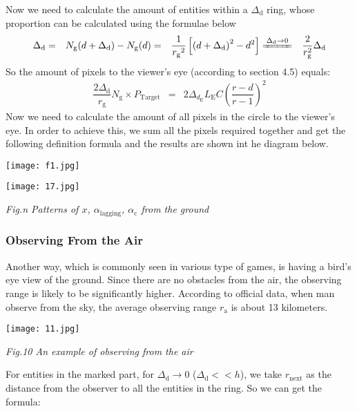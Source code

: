 \documentclass[12pt]{article}
\theoremstyle{definition}
\theoremstyle{remark}
\numberwithin{equation}{section}
\begin{document}
		Now we need to calculate the amount of entities within a $\Delta_\mathrm{d}$ ring, whose proportion can be calculated using the formulae below
		\begin{align}
			\Delta_\mathrm{d}&=&N_\mathrm{g}(d+\Delta_\mathrm{d})-N_\mathrm{g}(d)&=&\dfrac{1}{{r_\mathrm{g}}^2}\left[\left(d+\Delta_\mathrm{ d}\right)^2-d^2\right]&\xlongequal{\Delta_\mathrm{d}\to 0}&\dfrac{2}{{r_\mathrm{g}^2}}\Delta_\mathrm{d}
		\end{align}
		So the amount of pixels to the viewer's eye (according to section 4.5) equals:
		\begin{align}
			\dfrac{2\Delta_\mathrm{d}}{r_\mathrm{g}}N_\mathrm{g}\times P_\mathrm{Target}&=&2\Delta_{d_\mathrm{E}}L_\mathrm{E}C\left(\dfrac{r-d}{r-1}\right)^2
		\end{align}
		Now we need to calculate the amount of all pixels in the circle to the viewer's eye. In order to achieve this, we sum all the pixels required together and get the following definition formula and the results are shown int he diagram below.
		
		\begin{center}
			\texttt{[image: f1.jpg]}
			
			\texttt{[image: 17.jpg]}
			
			\textit{Fig.n Patterns of $x$, $\alpha_\mathrm{lagging}$, $\alpha_\mathrm{c}$ from the ground}
		\end{center}
		
		
		\subsubsection{Observing From the Air}
		Another way, which is commonly seen in various type of games, is having a bird's eye view of the ground. Since there are no obstacles from the air, the observing range is likely to be significantly higher. According to official data, when man observe from the sky, the average observing range $r_\mathrm{a}$ is about 13 kilometers.
		
		\begin{center}
			\texttt{[image: 11.jpg]}
			
			\textit{Fig.10 An example of observing from the air}
		\end{center}
	
		For entities in the marked part, for $\Delta_\mathrm{d} \to 0$ ($\Delta_\mathrm{d}<<h$), we take $r_\mathrm{next}$ as the distance from the observer to all the entities in the ring. So we can get the formula:		
		
\end{document}
